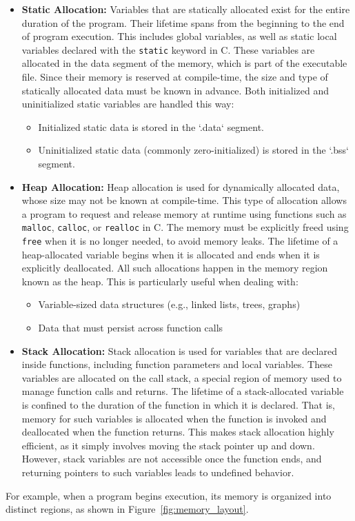 \documentclass[12pt]{book}
\begin{document}
\begin{itemize}
    \item \textbf{Static Allocation:} 
    Variables that are statically allocated exist for the entire duration of the program. Their lifetime spans from the beginning to the end of program execution. This includes global variables, as well as static local variables declared with the \texttt{static} keyword in C. These variables are allocated in the data segment of the memory, which is part of the executable file. Since their memory is reserved at compile-time, the size and type of statically allocated data must be known in advance. Both initialized and uninitialized static variables are handled this way: 
    \begin{itemize}
        \item Initialized static data is stored in the `.data` segment.
        \item Uninitialized static data (commonly zero-initialized) is stored in the `.bss` segment.
    \end{itemize}

    \item \textbf{Heap Allocation:}
    Heap allocation is used for dynamically allocated data, whose size may not be known at compile-time. This type of allocation allows a program to request and release memory at runtime using functions such as \texttt{malloc}, \texttt{calloc}, or \texttt{realloc} in C. The memory must be explicitly freed using \texttt{free} when it is no longer needed, to avoid memory leaks. The lifetime of a heap-allocated variable begins when it is allocated and ends when it is explicitly deallocated. All such allocations happen in the memory region known as the heap. This is particularly useful when dealing with:
    \begin{itemize}
        \item Variable-sized data structures (e.g., linked lists, trees, graphs)
        \item Data that must persist across function calls
    \end{itemize}

    \item \textbf{Stack Allocation:}
    Stack allocation is used for variables that are declared inside functions, including function parameters and local variables. These variables are allocated on the call stack, a special region of memory used to manage function calls and returns. The lifetime of a stack-allocated variable is confined to the duration of the function in which it is declared. That is, memory for such variables is allocated when the function is invoked and deallocated when the function returns. This makes stack allocation highly efficient, as it simply involves moving the stack pointer up and down. However, stack variables are not accessible once the function ends, and returning pointers to such variables leads to undefined behavior.
\end{itemize}
For example, when a program begins execution, its memory is organized into distinct regions, as shown in Figure~\ref{fig:memory_layout}.
\end{document}

